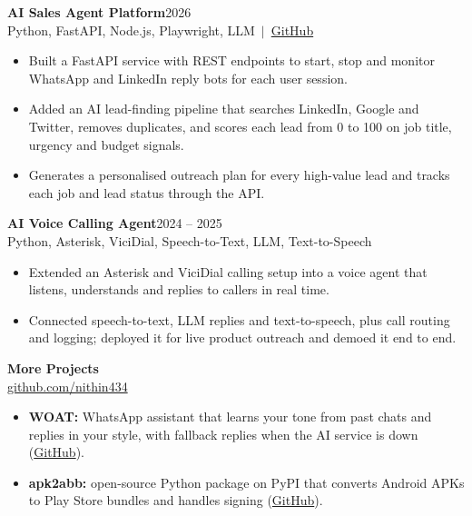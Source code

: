 \documentclass[a4paper,10pt]{article}
\newcommand{\project}[3]{\textbf{#1}\hfill #2\\{\small #3}\par\vspace{-2pt}}
\newcommand{\gap}{\vspace{5pt}}
\begin{document}
\project{AI Sales Agent Platform}{2026}{Python, FastAPI, Node.js, Playwright, LLM \,$|$\, \href{https://github.com/nithin434/sales_agent}{GitHub}}
\begin{itemize}
  \item Built a FastAPI service with REST endpoints to start, stop and monitor WhatsApp and LinkedIn reply bots for each user session.
  \item Added an AI lead-finding pipeline that searches LinkedIn, Google and Twitter, removes duplicates, and scores each lead from 0 to 100 on job title, urgency and budget signals.
  \item Generates a personalised outreach plan for every high-value lead and tracks each job and lead status through the API.
\end{itemize}
\gap

\project{AI Voice Calling Agent}{2024 -- 2025}{Python, Asterisk, ViciDial, Speech-to-Text, LLM, Text-to-Speech}
\begin{itemize}
  \item Extended an Asterisk and ViciDial calling setup into a voice agent that listens, understands and replies to callers in real time.
  \item Connected speech-to-text, LLM replies and text-to-speech, plus call routing and logging; deployed it for live product outreach and demoed it end to end.
\end{itemize}
\gap

\project{More Projects}{}{\href{https://github.com/nithin434}{github.com/nithin434}}
\begin{itemize}
  \item \textbf{WOAT:} WhatsApp assistant that learns your tone from past chats and replies in your style, with fallback replies when the AI service is down (\href{https://github.com/nithin434/woat}{GitHub}).
  \item \textbf{apk2abb:} open-source Python package on PyPI that converts Android APKs to Play Store bundles and handles signing (\href{https://github.com/nithin434/apk2abb}{GitHub}).
\end{itemize}

\end{document}
